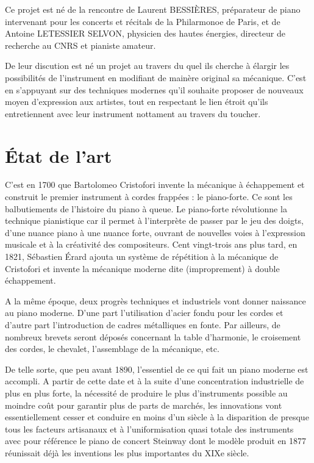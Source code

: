 \documentclass[french,a4paper,12pt]{report}
\begin{document}
  Ce projet est né de la rencontre de Laurent BESSIÈRES, préparateur de piano intervenant pour les concerts et récitals de la Philarmonoe de Paris, et de Antoine LETESSIER SELVON, physicien des hautes énergies, directeur de recherche au CNRS et pianiste amateur. 
  
  De leur discution est né un projet au travers du quel ils cherche à élargir les possibilités de l'instrument en modifiant de mainère original sa mécanique. C'est en s'appuyant sur des techniques modernes qu'il souhaite proposer de nouveaux moyen d'expression aux artistes, tout en respectant le lien étroit qu'ils entretiennent avec leur instrument nottament au travers du toucher.
  
  \section{État de l'art}
  
  C’est en 1700 que Bartolomeo Cristofori invente la mécanique à échappement et construit le premier instrument à cordes frappées : le piano-forte. Ce sont les balbutiements de l’histoire du piano à queue. Le piano-forte révolutionne la technique pianistique car il permet à l’interprète de passer par le jeu des doigts, d’une nuance piano à une nuance forte, ouvrant de nouvelles voies à l’expression musicale et à la créativité des compositeurs. Cent vingt-trois ans plus tard, en 1821, Sébastien Érard ajouta un système de répétition à la mécanique de Cristofori et invente la mécanique moderne dite (improprement) à double échappement.

A la même époque, deux progrès techniques et industriels vont donner naissance au piano moderne. D’une part l’utilisation d’acier fondu pour les cordes et d’autre part l’introduction de cadres métalliques en fonte. Par ailleurs, de nombreux brevets seront déposés concernant la table d’harmonie, le croisement des cordes, le chevalet, l’assemblage de la mécanique, etc. 

De telle sorte, que peu avant 1890, l’essentiel de ce qui fait un piano moderne est accompli. A partir de cette date et à la suite d’une concentration industrielle de plus en plus forte, la nécessité de produire le plus d’instruments possible au moindre coût pour garantir plus de parts de marchés, les innovations vont essentiellement cesser et conduire en moins d’un siècle à la disparition de presque tous les facteurs artisanaux et à l’uniformisation quasi totale des instruments avec pour référence le piano de concert Steinway dont le modèle produit en 1877 réunissait déjà les inventions les plus importantes du XIXe siècle.
\end{document}
